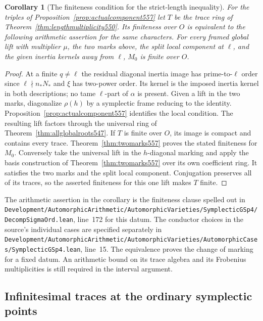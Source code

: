 \documentclass[a4paper,11pt]{article}
\newtheorem{corollary}[proposition]{Corollary}
\theoremstyle{definition}
\theoremstyle{remark}
\newcommand{\srcloc}[2]{{\small\nolinkurl{#1.lean}}, line~#2}
\numberwithin{equation}{section}
\begin{document}
\begin{corollary}[The finiteness condition for the strict-length inequality]
\leavevmode\label{cor:finmark557}
For the triples of Proposition~\ref{prop:actualcomponent557}
let \(T\) be the trace ring of Theorem~\ref{thm:lengthmultiplicity550}.
Its finiteness over \(O\) is equivalent to the following
arithmetic assertion for the same characters. For every framed
global lift with multiplier \(\mu\), the two marks above, the
split local component at \(\ell\), and the given inertia kernels
away from \(\ell\), \(M_0\) is finite over \(O\).
\end{corollary}
\begin{proof}
At a finite \(q\ne\ell\) the residual diagonal inertia image
has prime-to-\(\ell\) order since \(\ell\nmid n_*N_*\) and
\(\xi\) has two-power order. Its kernel is the imposed inertia
kernel in both descriptions; no tame \(\ell\)-part of
\(\alpha\) is present. Given a lift in the two marks, diagonalize
\(\rho(h)\) by a symplectic frame reducing to the identity.
Proposition~\ref{prop:actualcomponent557} identifies the local
condition. The resulting lift factors through the universal
ring of Theorem~\ref{thm:allglobalroots547}. If \(T\) is finite
over \(O\), its image is compact and contains every trace.
Theorem~\ref{thm:twomarks557} proves the stated finiteness
for \(M_0\). Conversely take the universal lift in the
\(h\)-diagonal marking and apply the basis construction of
Theorem~\ref{thm:twomarks557} over its own coefficient ring.
It satisfies the two marks and the split local component.
Conjugation preserves all of its traces, so the asserted
finiteness for this one lift makes \(T\) finite.
\end{proof}

The arithmetic assertion in the corollary is the finiteness
clause spelled out in
\srcloc{Development/AutomorphicArithmetic/AutomorphicVarieties/SymplecticGSp4/DecompSigmaOrd}{172}
for this datum. The conductor choices in the source's individual
cases are specified separately in
\srcloc{Development/AutomorphicArithmetic/AutomorphicVarieties/AutomorphicCases/SymplecticGSp4}{15}.
The equivalence proves the change of marking for a fixed datum.
An arithmetic bound on its trace algebra and its Frobenius
multiplicities is still required in the interval argument.


\subsection{Infinitesimal traces at the ordinary symplectic points}
\label{sec:inftan558}
\end{document}
